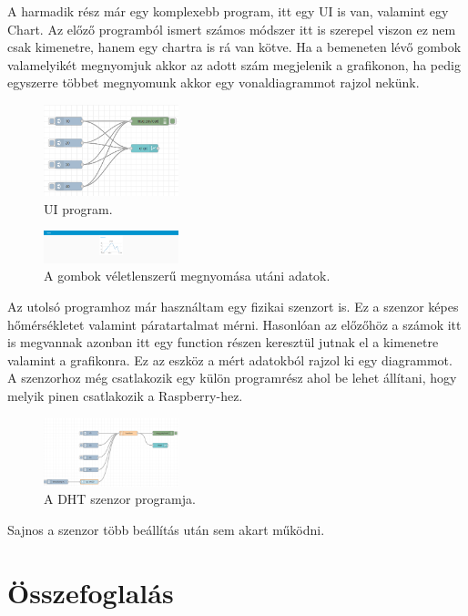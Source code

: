 \documentclass[a4paper,12pt,oneside]{report}
\begin{document}
A harmadik rész már egy komplexebb program, itt egy UI is van, valamint egy Chart. Az előző programból ismert számos módszer
itt is szerepel viszon ez nem csak kimenetre, hanem egy chartra is rá van kötve. Ha a bemeneten lévő gombok valamelyikét megnyomjuk 
akkor az adott szám megjelenik a grafikonon, ha pedig egyszerre többet megnyomunk akkor egy vonaldiagrammot rajzol nekünk.
\begin{figure}[htbp]
	\centering
	\includegraphics[width=0.35\textwidth]{fig/uichart.png}
	\caption{UI program.}
	\label{fig-uichart}
\end{figure}
\begin{figure}[htbp]
	\centering
	\includegraphics[width=0.35\textwidth]{fig/chart.png}
	\caption{A gombok véletlenszerű megnyomása utáni adatok.}
	\label{fig-chart}
\end{figure}

Az utolsó programhoz már használtam egy fizikai szenzort is. Ez a szenzor képes hőmérsékletet valamint páratartalmat mérni.
Hasonlóan az előzőhöz a számok itt is megvannak azonban itt egy function részen keresztül jutnak el a kimenetre valamint a 
grafikonra. Ez az eszköz a mért adatokból rajzol ki egy diagrammot. A szenzorhoz még csatlakozik egy külön programrész ahol be lehet
állítani, hogy melyik pinen csatlakozik a Raspberry-hez.
\begin{figure}[htbp]
	\centering
	\includegraphics[width=0.35\textwidth]{fig/dht.png}
	\caption{A DHT szenzor programja.}
	\label{fig-dht}
\end{figure}

Sajnos a szenzor több beállítás után sem akart működni.

\chapter{Összefoglalás}
\end{document}
